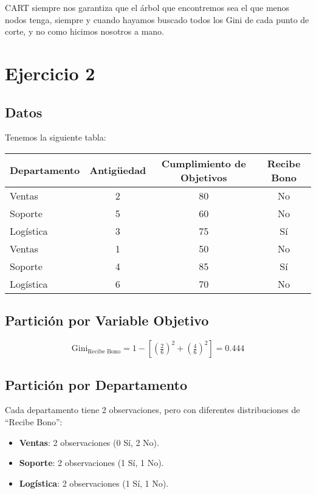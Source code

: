 \documentclass[12pt]{article}
\begin{document}
CART siempre nos garantiza que el árbol que encontremos sea el que menos nodos tenga, siempre y cuando hayamos buscado todos los Gini de cada punto de corte, y no como hicimos nosotros a mano.

\section{Ejercicio 2}

\subsection{Datos}

Tenemos la siguiente tabla:

\begin{table}[h]
  \centering
  \begin{tabular}{lccc}
    \toprule
    Departamento & Antigüedad & Cumplimiento de Objetivos & Recibe Bono \\
    \midrule
    Ventas    & 2 & 80 & No \\
    Soporte   & 5 & 60 & No \\
    Logística & 3 & 75 & Sí \\
    Ventas    & 1 & 50 & No \\
    Soporte   & 4 & 85 & Sí \\
    Logística & 6 & 70 & No \\
    \bottomrule
  \end{tabular}
\end{table}

\subsection{Partición por Variable Objetivo}
\[
  \mathrm{Gini}_{\text{Recibe Bono}} = 1 - \left[\left(\tfrac{2}{6}\right)^2 + \left(\tfrac{4}{6}\right)^2\right] = 0.444
\]

\subsection{Partición por Departamento}
Cada departamento tiene 2 observaciones, pero con diferentes distribuciones de ``Recibe Bono'':
\begin{itemize}
  \item \textbf{Ventas}: 2 observaciones (0 Sí, 2 No).
  \item \textbf{Soporte}: 2 observaciones (1 Sí, 1 No).
  \item \textbf{Logística}: 2 observaciones (1 Sí, 1 No).
\end{itemize}
\end{document}
